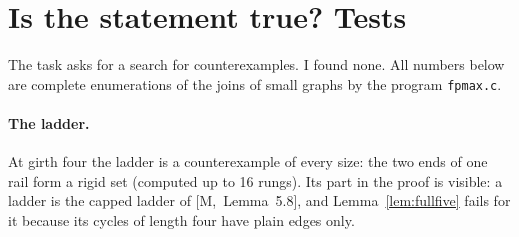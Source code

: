 \documentclass[11pt]{article}
\newcommand{\M}[1]{[M,~#1]}
\begin{document}
\section{Is the statement true? Tests}\label{sec:tests}

The task asks for a search for counterexamples. I found none. All numbers below are complete
enumerations of the joins of small graphs by the program \texttt{fpmax.c}.

\paragraph{The ladder.} At girth four the ladder is a counterexample of every size: the two ends
of one rail form a rigid set (computed up to 16 rungs). Its part in the proof is visible: a
ladder is the capped ladder of \M{Lemma~5.8}, and Lemma~\ref{lem:fullfive} fails for it because
its cycles of length four have plain edges only.
\end{document}
